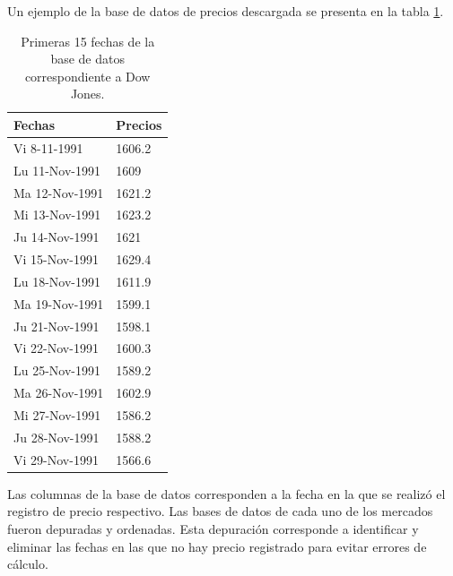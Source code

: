 Un ejemplo de la base de datos de precios descargada se presenta en la tabla \ref{ejemplo_data}.
\begin{table}[]
	\begin{tabular}{|l|l|}
		\hline
		Fechas         & Precios \\ \hline
		Vi 8-11-1991   & 1606.2  \\ \hline
		Lu 11-Nov-1991 & 1609    \\ \hline
		Ma 12-Nov-1991 & 1621.2  \\ \hline
		Mi 13-Nov-1991 & 1623.2  \\ \hline
		Ju 14-Nov-1991 & 1621    \\ \hline
		Vi 15-Nov-1991 & 1629.4  \\ \hline
		Lu 18-Nov-1991 & 1611.9  \\ \hline
		Ma 19-Nov-1991 & 1599.1  \\ \hline
		Ju 21-Nov-1991 & 1598.1  \\ \hline
		Vi 22-Nov-1991 & 1600.3  \\ \hline
		Lu 25-Nov-1991 & 1589.2  \\ \hline
		Ma 26-Nov-1991 & 1602.9  \\ \hline
		Mi 27-Nov-1991 & 1586.2  \\ \hline
		Ju 28-Nov-1991 & 1588.2  \\ \hline
		Vi 29-Nov-1991 & 1566.6  \\ \hline
	\end{tabular}
\label{ejemplo_data}
\caption{Primeras 15 fechas de la base de datos correspondiente a Dow Jones.}
\end{table}

Las columnas de la base de datos corresponden a la fecha en la que se realizó el registro de precio respectivo.
Las bases de datos de cada uno de los mercados fueron depuradas y ordenadas. Esta depuración corresponde a identificar y eliminar las fechas en las que no hay precio registrado para evitar errores de cálculo.


